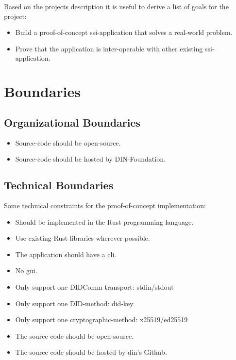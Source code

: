 Based on the projects description it is useful to derive a list of goals for the project:

\begin{itemize}
    \item Build a proof-of-concept \acrshort{ssi}-application that solves a real-world problem.
    \item Prove that the application is inter-operable with other existing \acrshort{ssi}-application.
\end{itemize}

\section{Boundaries}

\subsection{Organizational Boundaries}

\begin{itemize}
    \item Source-code should be open-source.
    \item Source-code should be hosted by DIN-Foundation.
\end{itemize}

\subsection{Technical Boundaries}
Some technical constraints for the proof-of-concept implementation:

\begin{itemize}
    \item Should be implemented in the Rust programming language.
    \item Use existing Rust libraries wherever possible.
    \item The application should have a \acrfull{cli}.
    \item No \acrfull{gui}.
    \item Only support one DIDComm transport: \acrshort{stdin}/\acrshort{stdout}
    \item Only support one DID-method: \gls{did-key}
    \item Only support one cryptographic-method: x25519/ed25519
    \item The source code should be open-source.
    \item The source code should be hosted by \acrshort{din}'s Github.
\end{itemize}



